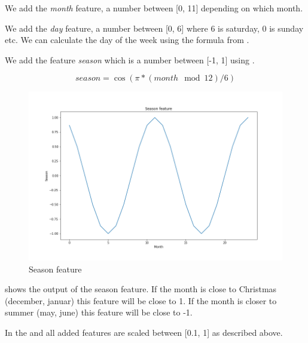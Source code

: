 We add the \textit{month} feature, a number between [0, 11] depending on which month.

We add the \textit{day} feature, a number between [0, 6] where 6 is saturday, 0 is sunday etc.
We can calculate the day of the week using the formula 
from .

We add the feature \textit{season} which is a number between [-1, 1] using .

\begin{equation}
  season = \cos(\pi * (month \mod{12}) / 6)
  \label{eq:season_feature}
\end{equation}

\begin{figure}[h!]
  \centering
  \includegraphics[width=\textwidth]{./figs/code_generated/season_feature.png}
  \hfill
  \caption{Season feature}
  \label{fig:season-feature}
\end{figure}

 shows the output of the season feature.
If the month is close to Christmas (december, januar) this feature will be close to 1.
If the month is closer to summer (may, june) this feature will be close to -1.

In the and all added features are scaled between [0.1, 1] as described above.

